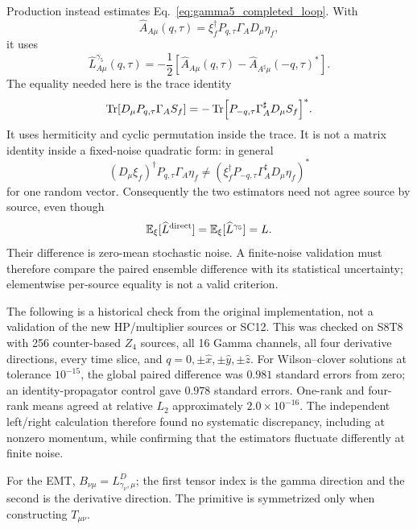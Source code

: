\documentclass[11pt,a4paper]{article}
\begin{document}
Production instead estimates Eq.~\eqref{eq:gamma5_completed_loop}.  With
\begin{equation}
 \widehat A_{A\mu}(q,\tau)
 =\xi_f^\dagger P_{q,\tau}\Gamma_A D_\mu\eta_f,
\end{equation}
it uses
\begin{equation}
 \widehat L^{\gamma_5}_{A\mu}(q,\tau)
 =-\frac12\left[
 \widehat A_{A\mu}(q,\tau)
 -\widehat A_{A^\sharp\mu}(-q,\tau)^*\right].
 \label{eq:gamma5_stochastic_estimator}
\end{equation}
The equality needed here is the trace identity
\begin{equation}
 \Tr[D_\mu P_{q,\tau}\Gamma_A S_f]
 =-\Tr[P_{-q,\tau}\Gamma_A^\sharp D_\mu S_f]^*.
\end{equation}
It uses hermiticity and cyclic permutation inside the trace.  It is not a
matrix identity inside a fixed-noise quadratic form: in general
\begin{equation}
 (D_\mu\xi_f)^\dagger P_{q,\tau}\Gamma_A\eta_f
 \ne
 \left(\xi_f^\dagger P_{-q,\tau}\Gamma_A^\sharp
 D_\mu\eta_f\right)^*
\end{equation}
for one random vector.  Consequently the two estimators need not agree source
by source, even though
\begin{equation}
 \mathbb E_\xi[\widehat L^{\rm direct}]
 =\mathbb E_\xi[\widehat L^{\gamma_5}]=L.
\end{equation}
Their difference is zero-mean stochastic noise.  A finite-noise validation
must therefore compare the paired ensemble difference with its statistical
uncertainty; elementwise per-source equality is not a valid criterion.

The following is a historical check from the original implementation, not a
validation of the new HP/multiplier sources or SC12. This was checked on S8T8
with 256 counter-based \(Z_4\) sources, all 16 Gamma
channels, all four derivative directions, every time slice, and
\(q=0,\pm\hat x,\pm\hat y,\pm\hat z\).  For Wilson--clover solutions at
tolerance \(10^{-15}\), the global paired difference was \(0.981\) standard
errors from zero; an identity-propagator control gave \(0.978\) standard
errors.  One-rank and four-rank means agreed at relative \(L_2\) approximately
\(2.0\times10^{-16}\).  The independent left/right calculation therefore
found no systematic discrepancy, including at nonzero momentum, while
confirming that the estimators fluctuate differently at finite noise.

For the EMT, \(B_{\nu\mu}=L^D_{\gamma_\nu,\mu}\); the first tensor index is
the gamma direction and the second is the derivative direction.  The primitive
is symmetrized only when constructing \(T_{\mu\nu}\).
\end{document}
